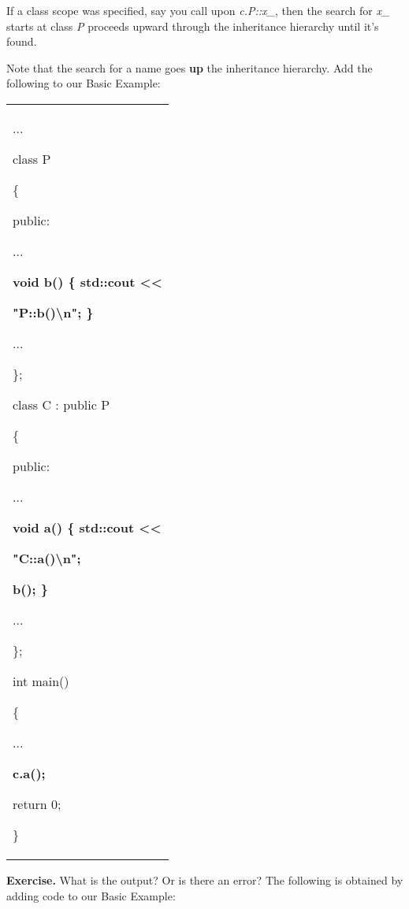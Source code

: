 \documentclass[
]{article}
\begin{document}
If a class scope was specified, say you call upon \emph{c.P::x\_}, then
the search for \emph{x\_} starts at class \emph{P} proceeds upward
through the inheritance hierarchy until it's found.

Note that the search for a name goes \textbf{up} the inheritance
hierarchy. Add the following to our Basic Example:

\begin{longtable}[]{@{}
  >{\raggedright\arraybackslash}p{}@{}}
\toprule\noalign{}
 \\
\midrule\noalign{}
\endhead
\bottomrule\noalign{}
\endlastfoot
...

class P

\{

public:

...

\textbf{void b() \{ std::cout <<{} }

\textbf{ "P::b()\textbackslash n"; \}}

...

\};

class C : public P

\{

public:

...

\textbf{void a() \{ std::cout <<{} }

\textbf{ "C::a()\textbackslash n";}

\textbf{ b(); \} }

...

\};

int main()

\{

...

\textbf{c.a();}

return 0;

\} \\
\end{longtable}

\textbf{Exercise.} What is the output? Or is there an error? The
following is obtained by adding code to our Basic Example:
\end{document}
